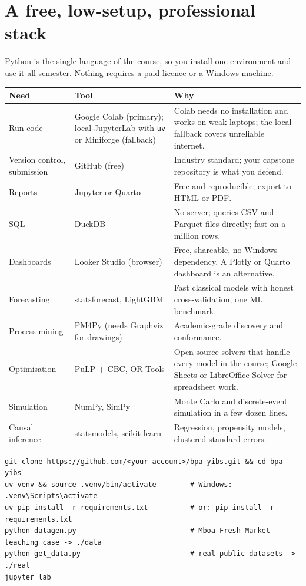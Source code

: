 \section*{A free, low-setup, professional stack}
Python is the single language of the course, so you install one environment and use it all semester. Nothing
requires a paid licence or a Windows machine.

\begin{center}\small
\begin{tabularx}{\linewidth}{@{}L{3.0cm}L{4.4cm}Y@{}}
\toprule
\textbf{Need} & \textbf{Tool} & \textbf{Why}\\\midrule
Run code & Google Colab (primary); local JupyterLab with \texttt{uv} or Miniforge (fallback) & Colab needs no installation and works on weak laptops; the local fallback covers unreliable internet.\\
Version control, submission & GitHub (free) & Industry standard; your capstone repository is what you defend.\\
Reports & Jupyter or Quarto & Free and reproducible; export to HTML or PDF.\\
SQL & DuckDB & No server; queries CSV and Parquet files directly; fast on a million rows.\\
Dashboards & Looker Studio (browser) & Free, shareable, no Windows dependency. A Plotly or Quarto dashboard is an alternative.\\
Forecasting & statsforecast, LightGBM & Fast classical models with honest cross-validation; one ML benchmark.\\
Process mining & PM4Py (needs Graphviz for drawings) & Academic-grade discovery and conformance.\\
Optimisation & PuLP + CBC, OR-Tools & Open-source solvers that handle every model in the course; Google Sheets or LibreOffice Solver for spreadsheet work.\\
Simulation & NumPy, SimPy & Monte Carlo and discrete-event simulation in a few dozen lines.\\
Causal inference & statsmodels, scikit-learn & Regression, propensity models, clustered standard errors.\\\bottomrule
\end{tabularx}
\end{center}

\begin{lstlisting}[style=sh,caption={Setting up (local). In Colab, run the same \texttt{pip} line with a leading \texttt{!}.}]
git clone https://github.com/<your-account>/bpa-yibs.git && cd bpa-yibs
uv venv && source .venv/bin/activate        # Windows: .venv\Scripts\activate
uv pip install -r requirements.txt          # or: pip install -r requirements.txt
python datagen.py                           # Mboa Fresh Market teaching case -> ./data
python get_data.py                          # real public datasets -> ./real
jupyter lab
\end{lstlisting}

